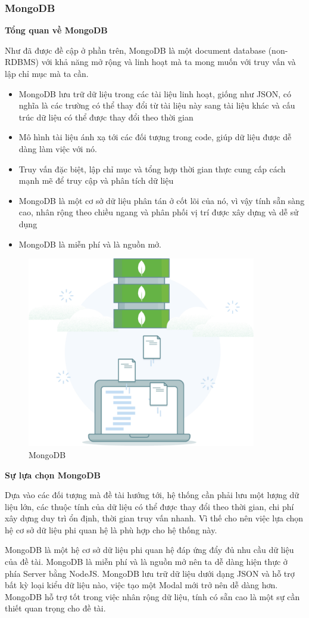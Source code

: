 \subsubsection{MongoDB}
\textbf{Tổng quan về MongoDB}
\par
Như đã được đề cập ở phần trên, MongoDB là một document database (non-RDBMS) với khả năng mở rộng và linh hoạt mà ta mong muốn với truy vấn và lập chỉ mục mà ta cần.
\begin{itemize}
    \item MongoDB lưu trữ dữ liệu trong các tài liệu linh hoạt, giống như JSON, có nghĩa là các trường có thể thay đổi từ tài liệu này sang tài liệu khác và cấu trúc dữ liệu có thể được thay đổi theo thời gian
    \item Mô hình tài liệu ánh xạ tới các đối tượng trong code, giúp dữ liệu được dễ dàng làm việc với nó.
    \item Truy vấn đặc biệt, lập chỉ mục và tổng hợp thời gian thực cung cấp cách mạnh mẽ để truy cập và phân tích dữ liệu
    \item MongoDB là một cơ sở dữ liệu phân tán ở cốt lõi của nó, vì vậy tính sẵn sàng cao, nhân rộng theo chiều ngang và phân phối vị trí được xây dựng và dễ sử dụng
    \item MongoDB là miễn phí và là nguồn mở.
\end{itemize}
\begin{figure}[h]
\centering
\includegraphics[width=10cm]{image/whats-mongodb-diagram.png}
\caption{MongoDB}
\label{fig:mongodb}
\end{figure}
\textbf{Sự lựa chọn MongoDB}
\par
Dựa vào các đối tượng mà đề tài hướng tới, hệ thống cần phải lưu một lượng dữ liệu lớn, các thuộc tính của dữ liệu có thể được thay đổi theo thời gian, chi phí xây dựng duy trì ổn định, thời gian truy vấn nhanh. Vì thế cho nên việc lựa chọn hệ cơ sở dữ liệu phi quan hệ là phù hợp cho hệ thống này.
\par
MongoDB là một hệ cơ sở dữ liệu phi quan hệ đáp ứng đẩy đủ nhu cầu dữ liệu của đề tài. MongoDB là miễn phí và là nguồn mở nên ta dễ dàng hiện thực ở phía Server bằng NodeJS. MongoDB lưu trữ dữ liệu dưới dạng JSON và hỗ trợ bất kỳ loại kiểu dữ liệu nào, việc tạo một Modal mới trở nên dễ dàng hơn. MongoDB hỗ trợ tốt trong việc nhân rộng dữ liệu, tính có sẵn cao là một sự cần thiết quan trọng cho đề tài.
